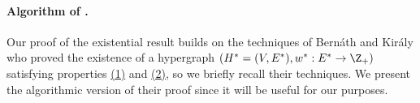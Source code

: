 


\paragraph{Algorithm of \cite{Bernath-Kiraly}.} Our proof of the existential result builds on the techniques of Bern\'{a}th and Kir\'{a}ly \cite{Bernath-Kiraly} who proved the existence of a hypergraph $(H^*=(V, E^*), w^*: E^*\rightarrow \Z_+)$ satisfying properties \hyperlink{WeakToStrong(1)}{(1)} and \hyperlink{WeakToStrong(2)}{(2)}, so we briefly recall their techniques. 
We present the algorithmic version of their proof since it will be useful for our purposes. 

